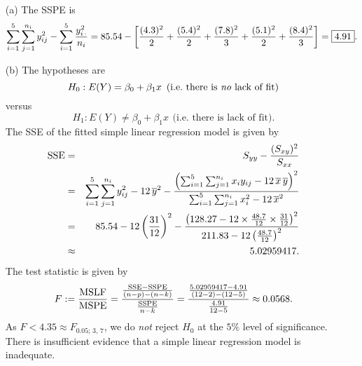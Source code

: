 \documentclass[11pt]{article}
\begin{document}
\begin{enumerate}
\item[(a)]
The SSPE is
$$
\sum_{i=1}^5 \sum_{j=1}^{n_i} y_{ij}^2 - \sum_{i=1}^5 \frac{y_{i\,\cdot}^2}{n_i} = 85.54 - \left[\frac{(4.3)^2}{2} + \frac{(5.4)^2}{2} + \frac{(7.8)^2}{3} + \frac{(5.1)^2}{2} + \frac{(8.4)^2}{3}\right] = \fbox{$4.91$}.
$$
\item[(b)]
The hypotheses are
$$
H_0 : E(Y) = \beta_0 + \beta_1 x \ \, \mbox{(i.e.~there is {\em no\/} lack of fit)}
$$
versus
$$
H_1 : E(Y) \ne \beta_0 + \beta_1 x \ \, \mbox{(i.e.~there is lack of fit)}.
$$
The SSE of the fitted simple linear regression model is given by
\begin{eqnarray*}
{\rm SSE} & = & S_{yy} - \frac{(S_{xy})^2}{S_{xx}} \\
& = & \sum_{i=1}^5 \sum_{j=1}^{n_i} y_{ij}^2 - 12\,\overline{y}^2 - \frac{\left(\sum_{i=1}^5 \sum_{j=1}^{n_i} x_i y_{ij} - 12\,\overline{x}\,\overline{y}\right)^2}{\sum_{i=1}^5 \sum_{j=1}^{n_i} x_{i}^2 - 12\,\overline{x}^2} \\
& = & 85.54 - 12\left(\frac{31}{12}\right)^2 - \frac{\left(128.27 - 12 \times \frac{48.7}{12}\times\frac{31}{12}\right)^2}{211.83 - 12\left(\frac{48.7}{12}\right)^2} \\
& \approx & 5.02959417.
\end{eqnarray*}
The test statistic is given by
$$
F := \frac{{\rm MSLF}}{{\rm MSPE}} = \frac{\frac{{\rm SSE} - {\rm SSPE}}{(n-p)-(n-k)}}{\frac{{\rm SSPE}}{n-k}} = \frac{\frac{5.02959417 - 4.91}{(12 - 2) - (12 - 5)}}{\frac{4.91}{12 - 5}} \approx 0.0568.
$$
As $F < 4.35 \approx F_{0.05;\,3,\,7}$, we do {\em not\/} reject $H_0$ at the $5\%$ level of significance. There is insufficient evidence that a simple linear regression model is inadequate.
\end{enumerate}
\end{document}
